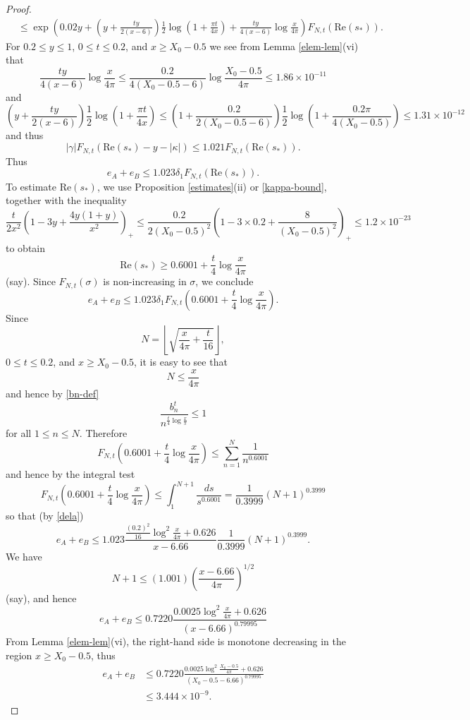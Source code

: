 \documentclass[a4paper,11pt,twoside]{amsart}
\begin{document}
\begin{proof}
\begin{align*}
&\leq \exp\left( 0.02 y + \left(y + \frac{ty}{2(x-6)}\right) \frac{1}{2} \log(1 + \frac{\pi t}{4x}) + \frac{ty}{4(x-6)} \log \frac{x}{4\pi} \right) F_{N,t}( \mathrm{Re}(s_*) ).
\end{align*}
For $0.2 \leq y \leq 1$, $0 \leq t \leq 0.2$, and $x \geq X_0 - 0.5$ we see from Lemma \ref{elem-lem}(vi) that
$$ \frac{ty}{4(x-6)} \log \frac{x}{4\pi} \leq \frac{0.2}{4(X_0 - 0.5-6)}\log \frac{X_0 - 0.5}{4\pi} \leq 1.86 \times 10^{-11}$$
and
$$ \left(y + \frac{ty}{2(x-6)}\right) \frac{1}{2} \log(1 + \frac{\pi t}{4x}) \leq \left(1 + \frac{0.2}{2(X_0-0.5-6)}\right) \frac{1}{2} \log\left(1 + \frac{0.2 \pi}{4(X_0-0.5)}\right) \leq 1.31 \times 10^{-12}$$
and thus
\begin{equation}\label{gafn}
 |\gamma| F_{N,t}( \mathrm{Re}(s_*) - y - |\kappa| ) \leq 1.021  F_{N,t}( \mathrm{Re}(s_*) ).
\end{equation}
Thus
$$  e_A + e_B \leq 1.023 \delta_1 F_{N,t}( \mathrm{Re}(s_*) ).$$
To estimate $\mathrm{Re}(s_*)$, we use Proposition \ref{estimates}(ii) or \eqref{kappa-bound}, together with the inequality
$$ \frac{t}{2x^2} \left(1-3y+\frac{4y(1+y)}{x^2}\right)_+ \leq \frac{0.2}{2 (X_0-0.5)^2} \left(1 - 3 \times 0.2 + \frac{8}{(X_0-0.5)^2}\right)_+
\leq 1.2 \times 10^{-23}$$
to obtain 
$$ \mathrm{Re}(s_*) \geq 0.6001 + \frac{t}{4} \log \frac{x}{4\pi}$$
(say).  Since $F_{N,t}(\sigma)$ is non-increasing in $\sigma$, we conclude
$$  e_A + e_B \leq 1.023 \delta_1 F_{N,t}\left( 0.6001 + \frac{t}{4} \log \frac{x}{4\pi} \right).$$
Since
$$ N = \left\lfloor \sqrt{\frac{x}{4\pi} + \frac{t}{16}} \right\rfloor,$$
$0 \leq t \leq 0.2$, and $x \geq X_0-0.5$, it is easy to see that
$$ N \leq \frac{x}{4\pi}$$
and hence by \eqref{bn-def}
$$ \frac{b_n^t}{n^{\frac{t}{4} \log \frac{x}{\pi}}} \leq 1$$
for all $1 \leq n \leq N$.  Therefore
$$ F_{N,t}\left( 0.6001 + \frac{t}{4} \log \frac{x}{4\pi} \right) \leq \sum_{n=1}^N \frac{1}{n^{0.6001}}$$
and hence by the integral test
$$ F_{N,t}\left( 0.6001 + \frac{t}{4} \log \frac{x}{4\pi} \right) \leq \int_1^{N+1} \frac{ds}{s^{0.6001}} = \frac{1}{0.3999} (N+1)^{0.3999} $$
so that (by \eqref{dela})
$$ e_A + e_B \leq 1.023 \frac{\frac{(0.2)^2}{16} \log^2 \frac{x}{4\pi} + 0.626}{x-6.66} \frac{1}{0.3999} (N+1)^{0.3999}.$$
We have
$$ N+1 \leq (1.001) \left(\frac{x-6.66}{4\pi}\right)^{1/2} $$
(say), and hence
$$ e_A + e_B \leq 0.7220 \frac{0.0025 \log^2 \frac{x}{4\pi} + 0.626}{(x-6.66)^{0.79995}}$$
From Lemma \ref{elem-lem}(vi), the right-hand side is monotone decreasing in the region $x \geq X_0-0.5$, thus
\begin{align*}
 e_A + e_B &\leq 0.7220 \frac{0.0025 \log^2 \frac{X_0-0.5}{4\pi} + 0.626}{(X_0-0.5-6.66)^{0.79995}} \\
&\leq 3.444 \times 10^{-9}.
\end{align*}


\end{proof}
\end{document}
